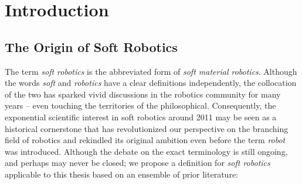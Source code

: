 \newpage
\chapter{Introduction}
\thispagestyle{empty}
\label{chap: intro}
\setcounter{page}{1}


\vspace*{-5mm}
\section{The Origin of Soft Robotics}
\label{sec: chap1 motivation}
The term \emph{soft robotics} is the abbreviated form of \emph{soft material robotics}. Although the words \emph{soft} and \emph{robotics} have a clear definitions independently, the collocation of the two has sparked vivid discussions in the robotics community for many years -- even touching the territories of the philosophical. Consequently, the exponential scientific interest in soft robotics around 2011 may be seen as a historical cornerstone that has revolutionized our perspective on the branching field of robotics and rekindled its original ambition even before the term \emph{robot} was introduced. Although the debate on the exact terminology is still ongoing, and perhaps may never be closed; we propose a definition for \emph{soft robotics} applicable to this thesis based on an ensemble of prior literature:


